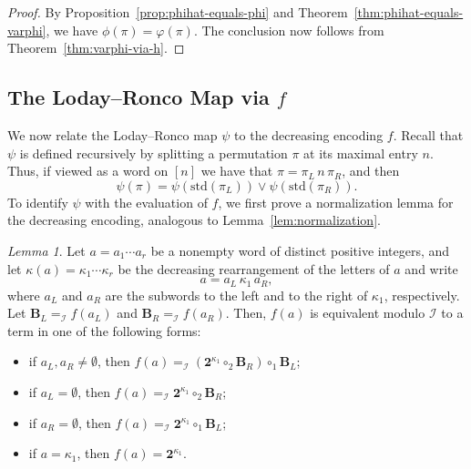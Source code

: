 \documentclass[a4paper]{article}
\theoremstyle{plain}
\theoremstyle{definition}
\theoremstyle{remark}
\numberwithin{equation}{section}
\newcommand{\std}{\mathrm{std}}
\newtheorem{lemma}[theorem]{Lemma}
\begin{document}
\begin{proof}
By Proposition~\ref{prop:phihat-equals-phi} and
Theorem~\ref{thm:phihat-equals-varphi}, we have $\phi(\pi)=\varphi(\pi)$.
The conclusion now follows from Theorem~\ref{thm:varphi-via-h}.
\end{proof}

\subsection{The Loday--Ronco Map via \(f\)}

We now relate the Loday--Ronco map \(\psi\) to the decreasing encoding \(f\). Recall that \(\psi\) is defined recursively by splitting a permutation \(\pi\) at its maximal entry \(n\). Thus, if viewed as a word on $[n]$ we have that $\pi=\pi_L\,n\,\pi_R$, and then
\[
\psi(\pi)=\psi(\std(\pi_L))\vee\psi(\std(\pi_R)).
\]
To identify \(\psi\) with the evaluation of \(f\), we first prove a normalization lemma for the decreasing encoding, analogous to Lemma~\ref{lem:normalization}.

\begin{lemma}\label{lem:f-word-normalization}
Let \(a=a_1\cdots a_r\) be a nonempty word of distinct positive integers, and
let \(\kappa(a)=\kappa_1\cdots\kappa_r\) be the decreasing rearrangement of the
letters of \(a\) and write
\[
a=a_L\,\kappa_1\,a_R,
\]
where \(a_L\) and \(a_R\) are the subwords to the left and to the right of
\(\kappa_1\), respectively. 
Let $\mathbf B_L =_{\mathcal I} f(a_L)$ and $\mathbf B_R =_{\mathcal I} f(a_R)$. Then, $f(a)$ is equivalent modulo ${\mathcal I}$ to a term in one of the following forms:
\begin{itemize}
    \item [$\cdot$] if $a_L,a_R\neq\emptyset$, then $f(a)=_{\mathcal I}(\mathbf 2^{\kappa_1}\circ_2 \mathbf B_R)\circ_1 \mathbf B_L$;
    \item [$\cdot$] if \(a_L=\emptyset\), then $f(a)=_{\mathcal I}\mathbf 2^{\kappa_1}\circ_2 \mathbf B_R$;
    \item [$\cdot$] if \(a_R=\emptyset\), then $f(a)=_{\mathcal I}\mathbf 2^{\kappa_1}\circ_1 \mathbf B_L$;
    \item [$\cdot$] if \(a=\kappa_1\), then \(f(a)=\mathbf 2^{\kappa_1}\).
\end{itemize}
\end{lemma}
\end{document}

